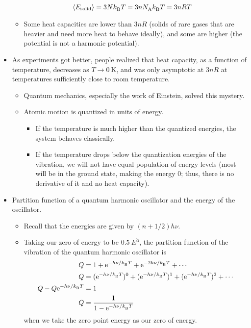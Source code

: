 \documentclass[../notes.tex]{subfiles}
\begin{document}
\begin{itemize}
\begin{itemize}
\begin{align*}
            \prb{E_\text{solid}} &= 3N\kB T = 3n\NA\kB T = 3nRT
        \end{align*}
        \item Some heat capacities are lower than $3nR$ (solids of rare gases that are heavier and need more heat to behave ideally), and some are higher (the potential is not a harmonic potential).
    \end{itemize}
    \item As experiments got better, people realized that heat capacity, as a function of temperature, decreases as $T\to\SI{0}{\kelvin}$, and was only asymptotic at $3nR$ at temperatures sufficiently close to room temperature.
    \begin{itemize}
        \item Quantum mechanics, especially the work of Einstein, solved this mystery.
        \item Atomic motion is quantized in units of energy.
        \begin{itemize}
            \item If the temperature is much higher than the quantized energies, the system behaves classically.
            \item If the temperature drops below the quantization energies of the vibration, we will not have equal population of energy levels (most will be in the ground state, making the energy 0; thus, there is no derivative of it and no heat capacity).
        \end{itemize}
    \end{itemize}
    \item Partition function of a quantum harmonic oscillator and the energy of the oscillator.
    \begin{itemize}
        \item Recall that the energies are given by $(n+1/2)h\nu$.
        \item Taking our zero of energy to be $\SI{0.5}{\hartree}$, the partition function of the vibration of the quantum harmonic oscillator is
        \begin{align*}
            Q &= 1+\e[-h\nu/\kB T]+\e[-2h\nu/\kB T]+\cdots\\
            Q &= (\e[-h\nu/\kB T])^0+(\e[-h\nu/\kB T])^1+(\e[-h\nu/\kB T])^2+\cdots\\
            Q-Q\e[-h\nu/\kB T] &= 1\\
            Q &= \frac{1}{1-\e[-h\nu/\kB T]}
        \end{align*}
        when we take the zero point energy as our zero of energy.

\end{itemize}
\end{itemize}
\end{document}
